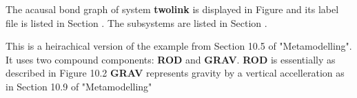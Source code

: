 
%

   The acausal bond graph of system \textbf{twolink} is
   displayed in Figure  and its label
   file is listed in Section .
   The subsystems are listed in Section .

This is a heirachical version of the example from Section 10.5 of
"Metamodelling".  It uses two compound components: {\bf ROD} and {\bf
GRAV}.  {\bf ROD} is essentially as described in Figure 10.2 {\bf
GRAV} represents gravity by a vertical accelleration as in Section
10.9 of "Metamodelling"


